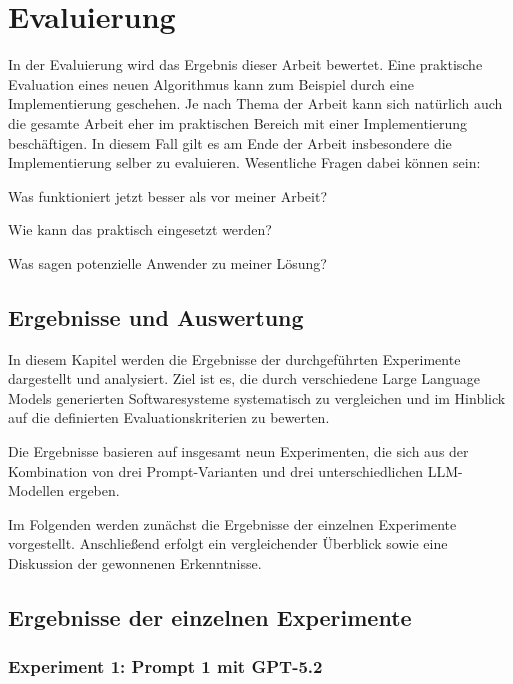 
\chapter{Evaluierung}
\label{chapter-evaluation}

In der Evaluierung wird das Ergebnis dieser Arbeit bewertet. Eine praktische Evaluation eines neuen Algorithmus kann zum Beispiel durch eine Implementierung geschehen. Je nach Thema der Arbeit kann sich natürlich auch die gesamte Arbeit eher im praktischen Bereich mit einer Implementierung beschäftigen. In diesem Fall gilt es am Ende der Arbeit insbesondere die Implementierung selber zu evaluieren. Wesentliche Fragen dabei können sein:
\begin{compactitem}[--]
  \item Was funktioniert jetzt besser als vor meiner Arbeit?
  \item Wie kann das praktisch eingesetzt werden?
  \item Was sagen potenzielle Anwender zu meiner Lösung?
\end{compactitem}

\section{Ergebnisse und Auswertung}
In diesem Kapitel werden die Ergebnisse der durchgeführten
Experimente dargestellt und analysiert. Ziel ist es,
die durch verschiedene Large Language Models generierten
Softwaresysteme systematisch zu vergleichen und im Hinblick
auf die definierten Evaluationskriterien zu bewerten.

Die Ergebnisse basieren auf insgesamt neun Experimenten,
die sich aus der Kombination von drei Prompt-Varianten
und drei unterschiedlichen LLM-Modellen ergeben.

Im Folgenden werden zunächst die Ergebnisse der einzelnen
Experimente vorgestellt. Anschließend erfolgt ein
vergleichender Überblick sowie eine Diskussion der
gewonnenen Erkenntnisse.

\section{Ergebnisse der einzelnen Experimente}
\subsection{Experiment 1: Prompt 1 mit GPT-5.2}

